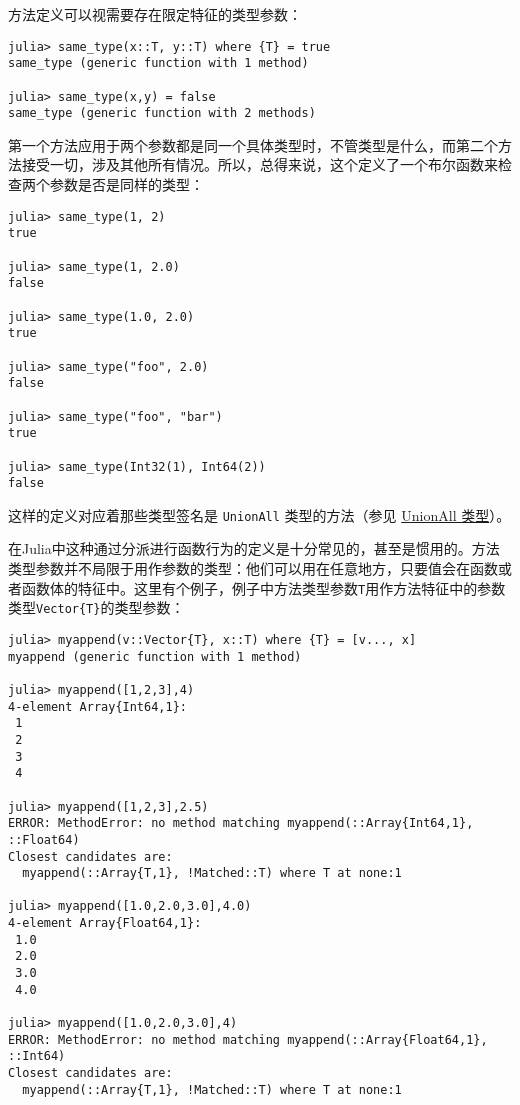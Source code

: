 方法定义可以视需要存在限定特征的类型参数：




\begin{verbatim}
julia> same_type(x::T, y::T) where {T} = true
same_type (generic function with 1 method)

julia> same_type(x,y) = false
same_type (generic function with 2 methods)
\end{verbatim}



第一个方法应用于两个参数都是同一个具体类型时，不管类型是什么，而第二个方法接受一切，涉及其他所有情况。所以，总得来说，这个定义了一个布尔函数来检查两个参数是否是同样的类型：




\begin{verbatim}
julia> same_type(1, 2)
true

julia> same_type(1, 2.0)
false

julia> same_type(1.0, 2.0)
true

julia> same_type("foo", 2.0)
false

julia> same_type("foo", "bar")
true

julia> same_type(Int32(1), Int64(2))
false
\end{verbatim}



这样的定义对应着那些类型签名是 \texttt{UnionAll} 类型的方法（参见 \hyperlink{11072845175692859046}{UnionAll 类型}）。



在Julia中这种通过分派进行函数行为的定义是十分常见的，甚至是惯用的。方法类型参数并不局限于用作参数的类型：他们可以用在任意地方，只要值会在函数或者函数体的特征中。这里有个例子，例子中方法类型参数\texttt{T}用作方法特征中的参数类型\texttt{Vector\{T\}}的类型参数：




\begin{verbatim}
julia> myappend(v::Vector{T}, x::T) where {T} = [v..., x]
myappend (generic function with 1 method)

julia> myappend([1,2,3],4)
4-element Array{Int64,1}:
 1
 2
 3
 4

julia> myappend([1,2,3],2.5)
ERROR: MethodError: no method matching myappend(::Array{Int64,1}, ::Float64)
Closest candidates are:
  myappend(::Array{T,1}, !Matched::T) where T at none:1

julia> myappend([1.0,2.0,3.0],4.0)
4-element Array{Float64,1}:
 1.0
 2.0
 3.0
 4.0

julia> myappend([1.0,2.0,3.0],4)
ERROR: MethodError: no method matching myappend(::Array{Float64,1}, ::Int64)
Closest candidates are:
  myappend(::Array{T,1}, !Matched::T) where T at none:1
\end{verbatim}



